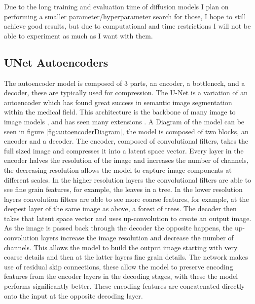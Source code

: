 \documentclass{UoYCSproject}
\begin{document}
Due to the long training and evaluation time of diffusion models I plan on performing a smaller parameter/hyperparameter search for those, I hope to still achieve good results, but due to computational and time restrictions I will not be able to experiment as much as I want with them.

\subsection{UNet Autoencoders} \label{UNET_METHODS}

The autoencoder model is composed of 3 parts, an encoder, a bottleneck, and a decoder, these are typically used for compression. The U-Net \cite{ronneberger2015unet} is a variation of an autoencoder which has found great success in semantic image segmentation within the medical field. This architecture is the backbone of many image to image models \cite{isola2018imagetoimage,saharia2022palette,dhariwal2021diffusion}, and has seen many extensions \cite{zhou2020unet, Qin_2020}. A Diagram of the model can be seen in figure \ref{fig:autoencoderDiagram}, the model is composed of two blocks, an encoder and a decoder. 
The encoder, composed of convolutional filters, takes the full sized image and compresses it into a latent space vector.
Every layer in the encoder halves the resolution of the image and increases the number of channels, the decreasing resolution allows the model to capture image components at different scales. 
In the higher resolution layers the convolutional filters are able to see fine grain features, for example, the leaves in a tree. In the lower resolution layers convolution filters are able to see more coarse features, for example, at the deepest layer of the same image as above, a forest of trees. 
The decoder then takes that latent space vector and uses up-convolution to create an output image. 
As the image is passed back through the decoder the opposite happens, the up-convolution layers increase the image resolution and decrease the number of channels. This allows the model to build the output image starting with very coarse details and then at the latter layers fine grain details.
The network makes use of residual skip connections, these allow the model to preserve encoding features from the encoder layers in the decoding stages, with these the model performs significantly better. These encoding features are concatenated directly onto the input at the opposite decoding layer. 
\end{document}
